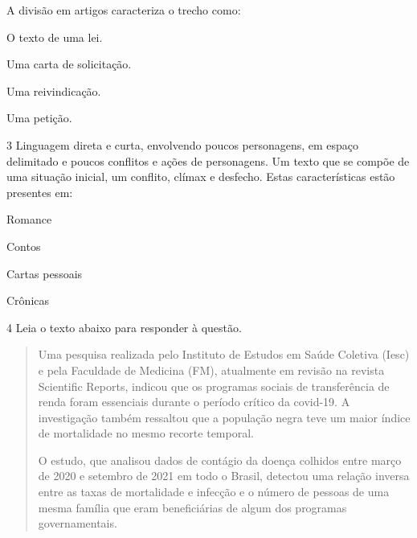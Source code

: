 
A divisão em artigos caracteriza o trecho como:

\begin{escolha}

    \item O texto de uma lei.

    \item Uma carta de solicitação.

    \item Uma reivindicação.

    \item Uma petição.

\end{escolha}

\pagebreak

\num{3} Linguagem direta e curta, envolvendo poucos personagens, em espaço
delimitado e poucos conflitos e ações de personagens. Um texto que se
compõe de uma situação inicial, um conflito, clímax e desfecho. Estas
características estão presentes em:

\begin{escolha}

    \item Romance

    \item Contos

    \item Cartas pessoais

    \item Crônicas

\end{escolha}

\num{4} Leia o texto abaixo para responder à questão.

\begin{quote}

Uma pesquisa realizada pelo Instituto de Estudos em Saúde Coletiva
(Iesc) e pela Faculdade de Medicina (FM), atualmente em revisão na
revista Scientific Reports, indicou que os programas sociais de
transferência de renda foram essenciais durante o período crítico da
covid-19. A investigação também ressaltou que a população negra teve um
maior índice de mortalidade no mesmo recorte temporal.

O estudo, que analisou dados de contágio da doença colhidos entre março
de 2020 e setembro de 2021 em todo o Brasil, detectou uma relação
inversa entre as taxas de mortalidade e infecção e o número de pessoas
de uma mesma família que eram beneficiárias de algum dos programas
governamentais.

\end{quote}

